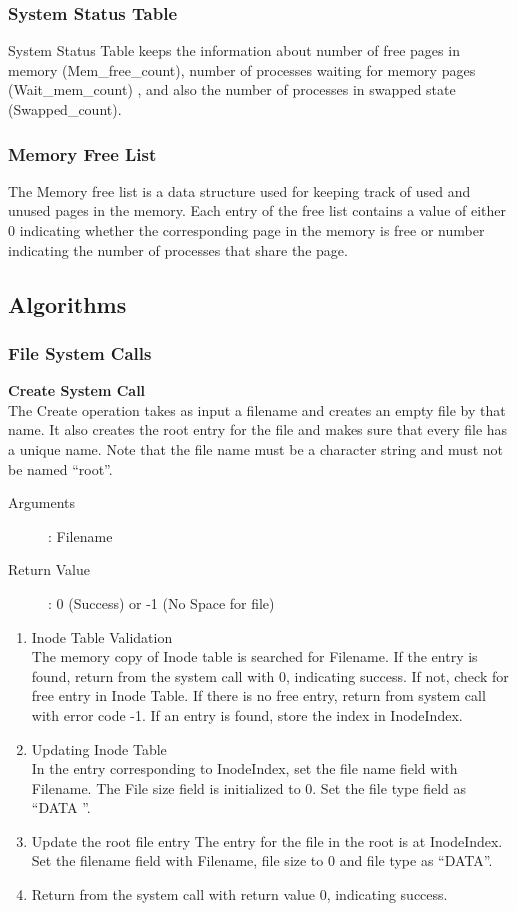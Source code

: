 \documentclass[10pt]{article}
\begin{document}
\subsubsection{System Status Table}
System Status Table keeps the information about number of free pages in memory (Mem\_free\_count), number of processes waiting for memory pages (Wait\_mem\_count) , and also the number of processes in swapped state (Swapped\_count).
\subsubsection{Memory Free List}
The Memory free list is a data structure used for keeping track of used and unused pages in the memory. Each entry of the free list contains a value of either 0 indicating whether the corresponding page in the memory is free or number indicating the number of processes that share the page.
\subsection{Algorithms}
\subsubsection{File System Calls}
\textbf{Create System Call}\\
The Create operation takes as input a filename and creates an empty file by that name. It also creates the root entry for the file and makes sure that every file has a unique name. Note that the file name must be a character string and must not be named “root”.
\begin{description}
\item[Arguments]: Filename
\item[Return Value]: 0 (Success) or -1 (No Space for file)
\end{description} 
\begin{enumerate}
\item Inode Table Validation  \\
The memory copy of Inode table is searched for Filename. If the entry is found, return from the system call with 0, indicating success. If not, check for free entry in Inode Table. If there is no free entry, return from system call with error code -1. If an entry is found, store the index in InodeIndex.
\item Updating Inode Table\\
In the entry corresponding to InodeIndex, set the file name field with Filename. The File size field is initialized to 0. Set the file type field as “DATA ”.
\item Update the root file entry
The entry for the file in the root is at InodeIndex. Set the filename field with Filename, file size to 0 and file type as “DATA”.
\item Return from the system call with return value 0, indicating success.
\end{enumerate}
\end{document}

